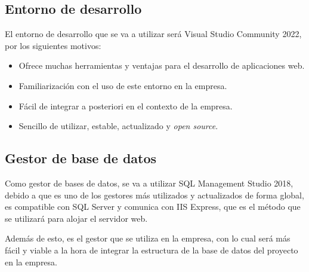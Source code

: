 \subsection{Entorno de desarrollo}
El entorno de desarrollo que se va a utilizar será Visual Studio Community 2022, por los siguientes motivos:
\begin{itemize}
 \item Ofrece muchas herramientas y ventajas para el desarrollo de aplicaciones web.
 \item Familiarización con el uso de este entorno en la empresa.
 \item Fácil de integrar a posteriori en el contexto de la empresa.
 \item Sencillo de utilizar, estable, actualizado y \emph{open source}.
\end{itemize}

\subsection{Gestor de base de datos}
Como gestor de bases de datos, se va a utilizar SQL Management Studio 2018, debido a que es uno de los gestores más utilizados y actualizados de forma global, es compatible con SQL Server y comunica con IIS Express, que es el método que se utilizará para alojar el servidor web.

Además de esto, es el gestor que se utiliza en la empresa, con lo cual será más fácil y viable a la hora de integrar la estructura de la base de datos del proyecto en la empresa.

